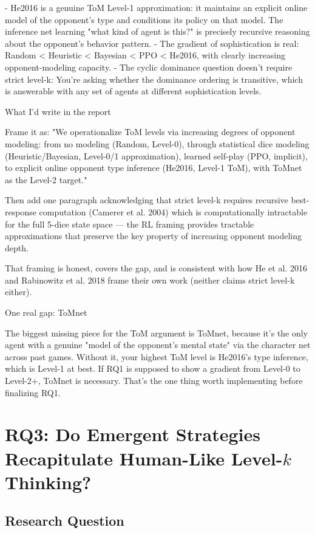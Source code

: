 \documentclass{article}
\begin{document}
  - He2016 is a genuine ToM Level-1 approximation: it maintains an explicit online model of the opponent's type and conditions its policy on that model. The inference net learning "what
  kind of agent is this?" is precisely recursive reasoning about the opponent's behavior pattern.
  - The gradient of sophistication is real: Random < Heuristic < Bayesian < PPO < He2016, with clearly increasing opponent-modeling capacity.
  - The cyclic dominance question doesn't require strict level-k: You're asking whether the dominance ordering is transitive, which is answerable with any set of agents at different
  sophistication levels.

  What I'd write in the report

  Frame it as: "We operationalize ToM levels via increasing degrees of opponent modeling: from no modeling (Random, Level-0), through statistical dice modeling (Heuristic/Bayesian,
  Level-0/1 approximation), learned self-play (PPO, implicit), to explicit online opponent type inference (He2016, Level-1 ToM), with ToMnet as the Level-2 target."

  Then add one paragraph acknowledging that strict level-k requires recursive best-response computation (Camerer et al. 2004) which is computationally intractable for the full 5-dice
  state space — the RL framing provides tractable approximations that preserve the key property of increasing opponent modeling depth.

  That framing is honest, covers the gap, and is consistent with how He et al. 2016 and Rabinowitz et al. 2018 frame their own work (neither claims strict level-k either).

  One real gap: ToMnet

  The biggest missing piece for the ToM argument is ToMnet, because it's the only agent with a genuine "model of the opponent's mental state" via the character net across past games.
  Without it, your highest ToM level is He2016's type inference, which is Level-1 at best. If RQ1 is supposed to show a gradient from Level-0 to Level-2+, ToMnet is necessary. That's the
  one thing worth implementing before finalizing RQ1.



\section{RQ3: Do Emergent Strategies Recapitulate Human-Like Level-$k$ Thinking?}

\subsection{Research Question}
\end{document}
